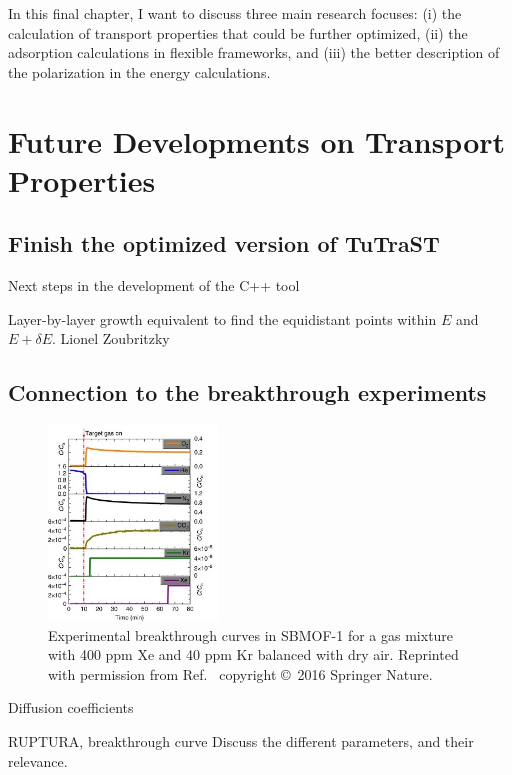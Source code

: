\documentclass[main]{subfiles}
\begin{document}
In this final chapter, I want to discuss three main research focuses: (i) the calculation of transport properties that could be further optimized, (ii) the adsorption calculations in flexible frameworks, and (iii) the better description of the polarization in the energy calculations.

\section{Future Developments on Transport Properties}

\subsection{Finish the optimized version of TuTraST}

Next steps in the development of the C++ tool

Layer-by-layer growth 
equivalent to find the equidistant points within $E$ and $E+\delta E$. 
Lionel Zoubritzky

\subsection{Connection to the breakthrough experiments}

\begin{figure}[ht]
  \centering
  \includegraphics[width=0.4\textwidth]{figures/6-perspectives/sbmof_breakthrough.jpg}
  \caption{ Experimental breakthrough curves in SBMOF-1 for a gas mixture with 400 ppm Xe and 40 ppm Kr balanced with dry air. Reprinted with permission from Ref.~\cite{Banerjee_2016} copyright \copyright\ 2016 Springer Nature. }\label{fgr:sbmof_breakthrough}
\end{figure}

Diffusion coefficients 

RUPTURA, breakthrough curve
Discuss the different parameters, and their relevance.
\end{document}
